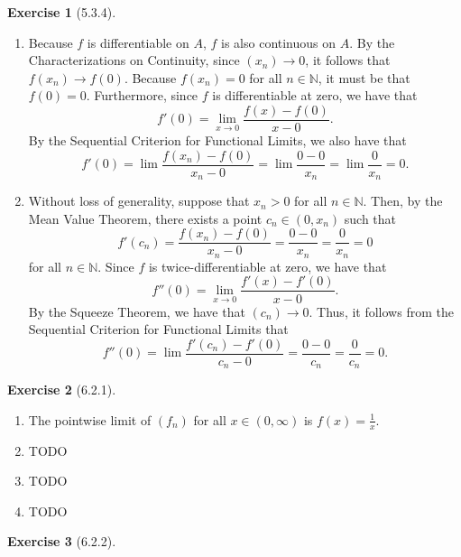 \documentclass{amsart}
\theoremstyle{definition}
\newtheorem{exercise}{Exercise}
\newcommand{\N}{\mathbb{N}}
\begin{document}
\begin{exercise}[5.3.4]
  \begin{enumerate}[label={(\alph*)}]
    \item Because $f$ is differentiable on $A$, $f$ is also continuous on $A$.
      By the Characterizations on Continuity, since $(x_n) \to 0$, it follows
      that $f(x_n) \to f(0)$. Because $f(x_n) = 0$ for all $n \in \N$, it must
      be that $f(0) = 0$. Furthermore, since $f$ is differentiable at zero, we
      have that
      \[
        f'(0) = \lim_{x \to 0} \frac{f(x) - f(0)}{x - 0}.
      \]
      By the Sequential Criterion for Functional Limits, we also have that
      \[
        f'(0) = \lim \frac{f(x_n) - f(0)}{x_n - 0} = \lim \frac{0 - 0}{x_n} =
        \lim \frac{0}{x_n} = 0.
      \]
    \item Without loss of generality, suppose that $x_n > 0$ for all $n \in \N$.
      Then, by the Mean Value Theorem, there exists a point $c_n \in (0, x_n)$
      such that
      \[
        f'(c_n) = \frac{f(x_n) - f(0)}{x_n - 0} = \frac{0 - 0}{x_n} =
        \frac{0}{x_n} = 0
      \]
      for all $n \in \N$. Since $f$ is twice-differentiable at zero, we have
      that
      \[
        f''(0) = \lim_{x \to 0} \frac{f'(x) - f'(0)}{x - 0}.
      \]
      By the Squeeze Theorem, we have that $(c_n) \to 0$. Thus, it follows from
      the Sequential Criterion for Functional Limits that
      \[
        f''(0) = \lim \frac{f'(c_n) - f'(0)}{c_n - 0} = \frac{0 - 0}{c_n} =
        \frac{0}{c_n} = 0.
      \]
  \end{enumerate}
\end{exercise}

\begin{exercise}[6.2.1]
  \begin{enumerate}[label={(\alph*)}]
    \item The pointwise limit of $(f_n)$ for all $x \in (0, \infty)$ is $f(x) =
      \frac{1}{x}$.
    \item TODO
    \item TODO
    \item TODO
  \end{enumerate}
\end{exercise}

\begin{exercise}[6.2.2]
\end{exercise}
\end{document}
